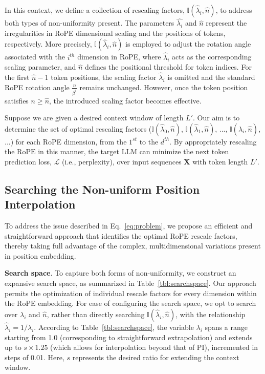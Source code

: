 In this context, we define a collection of rescaling factors, $\mathbb{I}(\hat{\lambda}_{i},\hat{n})$, to address both types of non-uniformity present. The parameters $\hat{\lambda_i}$ and $\hat{n}$ represent the irregularities in RoPE dimensional scaling and the positions of tokens, respectively. More precisely, $\mathbb{I}(\hat{\lambda}_{i},\hat{n})$ is employed to adjust the rotation angle associated with the $i^{th}$ dimension in RoPE, where $\hat\lambda_{i}$ acts as the corresponding scaling parameter, and $\hat{n}$ defines the positional threshold for token indices. For the first $\hat{n}-1$ token positions, the scaling factor $\hat\lambda_{i}$ is omitted and the standard RoPE rotation angle $\frac{n}{\beta^i}$ remains unchanged. However, once the token position satisfies $n\ge\hat{n}$, the introduced scaling factor becomes effective.

Suppose we are given a desired context window of length $L'$. Our aim is to determine the set of optimal rescaling factors ($\mathbb{I}(\hat{\lambda}_{0},\hat{n})$, $\mathbb{I}(\hat{\lambda}_{1},\hat{n})$, ..., $\mathbb{I}(\hat{\lambda}_{i},\hat{n})$, ...) for each RoPE dimension, from the $1^{st}$ to the $d^{th}$. By appropriately rescaling the $\text{RoPE}$ in this manner, the target $\text{LLM}$ can minimize the next token prediction loss, $\mathcal{L}$ (i.e., perplexity), over input sequences $\mathbf{X}$ with token length $L'$.

\subsection{Searching the Non-uniform Position Interpolation}

To address the issue described in Eq.~\ref{eq:problem}, we propose an efficient and straightforward approach that identifies the optimal RoPE rescale factors, thereby taking full advantage of the complex, multidimensional variations present in position embedding.

\textbf{Search space}. To capture both forms of non-uniformity, we construct an expansive search space, as summarized in Table~\ref{tbl:searchspace}. Our approach permits the optimization of individual rescale factors for every dimension within the RoPE embedding. For ease of configuring the search space, we opt to search over $\lambda_i$ and $\hat{n}$, rather than directly searching $\mathbb{I}(\hat{\lambda}_{i},\hat{n})$, with the relationship $\hat{\lambda}_{i}=1/\lambda_i$. According to Table~\ref{tbl:searchspace}, the variable $\lambda_i$ spans a range starting from 1.0 (corresponding to straightforward extrapolation) and extends up to $s\times1.25$ (which allows for interpolation beyond that of PI), incremented in steps of 0.01. Here, $s$ represents the desired ratio for extending the context window.

